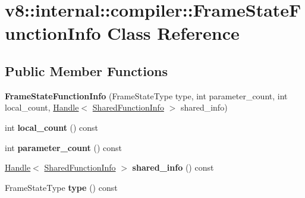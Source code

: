 \hypertarget{classv8_1_1internal_1_1compiler_1_1_frame_state_function_info}{}\section{v8\+:\+:internal\+:\+:compiler\+:\+:Frame\+State\+Function\+Info Class Reference}
\label{classv8_1_1internal_1_1compiler_1_1_frame_state_function_info}
\subsection*{Public Member Functions}
\begin{DoxyCompactItemize}
\item 
{\bfseries Frame\+State\+Function\+Info} (Frame\+State\+Type type, int parameter\+\_\+count, int local\+\_\+count, \hyperlink{classv8_1_1internal_1_1_handle}{Handle}$<$ \hyperlink{classv8_1_1internal_1_1_shared_function_info}{Shared\+Function\+Info} $>$ shared\+\_\+info)\hypertarget{classv8_1_1internal_1_1compiler_1_1_frame_state_function_info_afb7e7ab73226fd796cf2ba1e5ab5ee3c}{}\label{classv8_1_1internal_1_1compiler_1_1_frame_state_function_info_afb7e7ab73226fd796cf2ba1e5ab5ee3c}

\item 
int {\bfseries local\+\_\+count} () const \hypertarget{classv8_1_1internal_1_1compiler_1_1_frame_state_function_info_ac96aeb95cabd1614bcd452a59686673a}{}\label{classv8_1_1internal_1_1compiler_1_1_frame_state_function_info_ac96aeb95cabd1614bcd452a59686673a}

\item 
int {\bfseries parameter\+\_\+count} () const \hypertarget{classv8_1_1internal_1_1compiler_1_1_frame_state_function_info_ad9687bc38c24aba4c0c9db6c7161351a}{}\label{classv8_1_1internal_1_1compiler_1_1_frame_state_function_info_ad9687bc38c24aba4c0c9db6c7161351a}

\item 
\hyperlink{classv8_1_1internal_1_1_handle}{Handle}$<$ \hyperlink{classv8_1_1internal_1_1_shared_function_info}{Shared\+Function\+Info} $>$ {\bfseries shared\+\_\+info} () const \hypertarget{classv8_1_1internal_1_1compiler_1_1_frame_state_function_info_aa1bbb7601c8b89a89e4e3f0a0e287cde}{}\label{classv8_1_1internal_1_1compiler_1_1_frame_state_function_info_aa1bbb7601c8b89a89e4e3f0a0e287cde}

\item 
Frame\+State\+Type {\bfseries type} () const \hypertarget{classv8_1_1internal_1_1compiler_1_1_frame_state_function_info_a484652fa6ef0717bee7df7d195c2dfd1}{}\label{classv8_1_1internal_1_1compiler_1_1_frame_state_function_info_a484652fa6ef0717bee7df7d195c2dfd1}

\end{DoxyCompactItemize}
